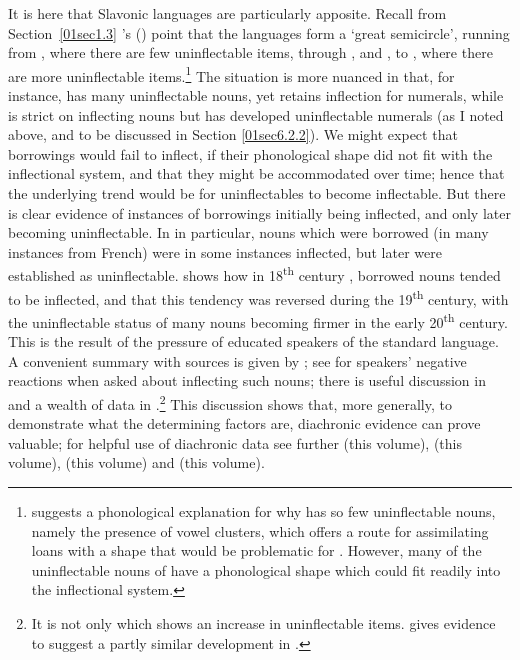 \documentclass[output=paper,colorlinks,citecolor=brown]{langscibook}
\begin{document}
It is here that Slavonic languages are particularly apposite. Recall from Section~\ref{01sec1.3} \citeauthor{worth1966}'s (\citeyear[11--12]{worth1966}) point that the languages form a `great semicircle', running from , where there are few uninflectable items, through ,  and , to , where there are more uninflectable items.\footnote{\citet{naylor1982} suggests a phonological explanation for why  has so few uninflectable nouns, namely the presence of vowel clusters, which offers a route for assimilating loans with a shape that would be problematic for . However, many of the uninflectable nouns of  have a phonological shape which could fit readily into the inflectional system.} The situation is more nuanced in that, for instance,  has many uninflectable nouns, yet retains inflection for numerals, while  is strict on inflecting nouns but has developed uninflectable numerals (as I noted above, and to be discussed in Section \ref{01sec6.2.2}). We might expect that borrowings would fail to inflect, if their phonological shape did not fit with the inflectional system, and that they might be accommodated over time; hence that the underlying trend would be for uninflectables to become inflectable. But there is clear evidence of instances of borrowings initially being inflected, and only later becoming uninflectable. In  in particular, nouns which were borrowed (in many instances from French) were in some instances inflected, but later were established as uninflectable. \citet[161--164]{mucnik1964} shows how in 18\textsuperscript{th} century , borrowed nouns tended to be inflected, and that this tendency was reversed during the 19\textsuperscript{th} century, with the uninflectable status of many nouns becoming firmer in the early 20\textsuperscript{th} century. This is the result of the pressure of educated speakers of the standard language. A convenient summary with sources is given by \citet[117--123]{comriestonepolinsky1996}; see \citet[45--55]{panov1968} for speakers' negative reactions when asked about inflecting such nouns; there is useful discussion in \citet{dunn1988} and a wealth of data in \citet{doleschal2000}.\footnote{It is not only  which shows an increase in uninflectable items. \citet{auty1968} gives evidence to suggest a partly similar development in .} This discussion shows that, more generally, to demonstrate what the determining factors are, diachronic evidence can prove valuable; for helpful use of diachronic data see further \citeauthor{chapters/08} (this volume), \citeauthor{chapters/07} (this volume), \citeauthor{chapters/09} (this volume) and \citeauthor{chapters/13} (this volume).
\end{document}
